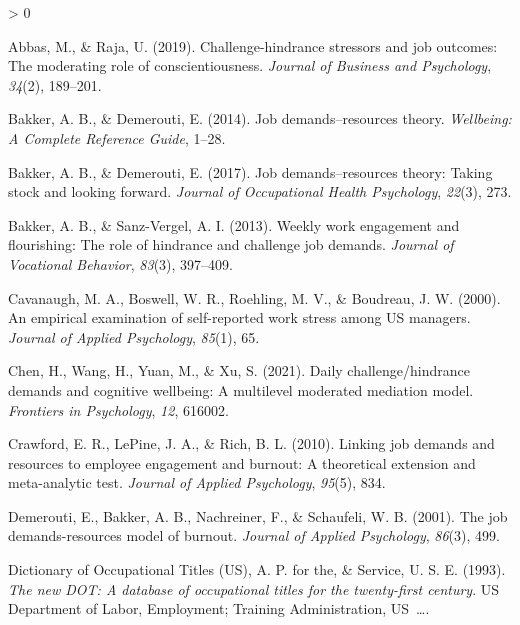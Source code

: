 \documentclass[
  english,
  man]{apa6}
\newlength{\cslhangindent}
\newenvironment{CSLReferences}[2] %
 {%
  \setlength{\parindent}{0pt}
  \ifodd #1 \everypar{\setlength{\hangindent}{\cslhangindent}}\ignorespaces\fi
  \ifnum #2 > 0
  \setlength{\parskip}{#2\baselineskip}
  \fi
 }%
 {}
\begin{document}
\begingroup
\setlength{\parindent}{-0.5in}
\setlength{\leftskip}{0.5in}

\hypertarget{refs}{}
\begin{CSLReferences}{1}{0}
\leavevmode\hypertarget{ref-abbas2019challenge}{}%
Abbas, M., \& Raja, U. (2019). Challenge-hindrance stressors and job outcomes: The moderating role of conscientiousness. \emph{Journal of Business and Psychology}, \emph{34}(2), 189--201.

\leavevmode\hypertarget{ref-bakker2014job}{}%
Bakker, A. B., \& Demerouti, E. (2014). Job demands--resources theory. \emph{Wellbeing: A Complete Reference Guide}, 1--28.

\leavevmode\hypertarget{ref-bakker2017job}{}%
Bakker, A. B., \& Demerouti, E. (2017). Job demands--resources theory: Taking stock and looking forward. \emph{Journal of Occupational Health Psychology}, \emph{22}(3), 273.

\leavevmode\hypertarget{ref-bakker2013weekly}{}%
Bakker, A. B., \& Sanz-Vergel, A. I. (2013). Weekly work engagement and flourishing: The role of hindrance and challenge job demands. \emph{Journal of Vocational Behavior}, \emph{83}(3), 397--409.

\leavevmode\hypertarget{ref-cavanaugh2000empirical}{}%
Cavanaugh, M. A., Boswell, W. R., Roehling, M. V., \& Boudreau, J. W. (2000). An empirical examination of self-reported work stress among US managers. \emph{Journal of Applied Psychology}, \emph{85}(1), 65.

\leavevmode\hypertarget{ref-chen2021daily}{}%
Chen, H., Wang, H., Yuan, M., \& Xu, S. (2021). Daily challenge/hindrance demands and cognitive wellbeing: A multilevel moderated mediation model. \emph{Frontiers in Psychology}, \emph{12}, 616002.

\leavevmode\hypertarget{ref-crawford2010linking}{}%
Crawford, E. R., LePine, J. A., \& Rich, B. L. (2010). Linking job demands and resources to employee engagement and burnout: A theoretical extension and meta-analytic test. \emph{Journal of Applied Psychology}, \emph{95}(5), 834.

\leavevmode\hypertarget{ref-demerouti2001job}{}%
Demerouti, E., Bakker, A. B., Nachreiner, F., \& Schaufeli, W. B. (2001). The job demands-resources model of burnout. \emph{Journal of Applied Psychology}, \emph{86}(3), 499.

\leavevmode\hypertarget{ref-advisory1993new}{}%
Dictionary of Occupational Titles (US), A. P. for the, \& Service, U. S. E. (1993). \emph{The new DOT: A database of occupational titles for the twenty-first century}. US Department of Labor, Employment; Training Administration, US~\ldots.


\end{CSLReferences}
\end{document}
